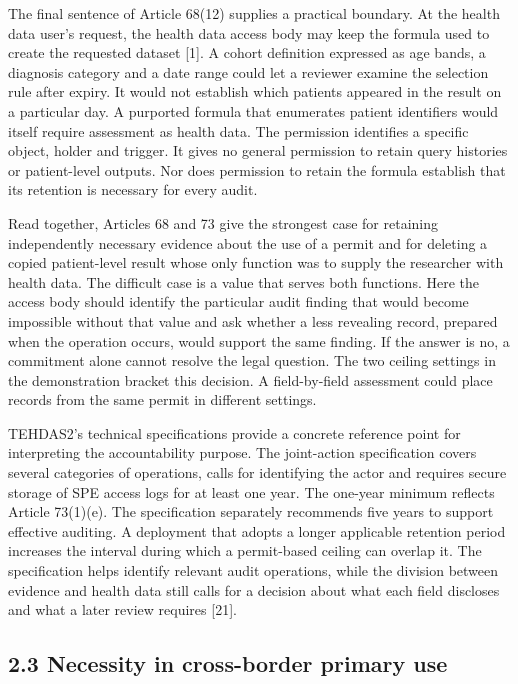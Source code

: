 \documentclass[preprint,review,12pt]{elsarticle}
\begin{document}
The final sentence of Article 68(12) supplies a practical boundary. At
the health data user's request, the health data access body may keep the
formula used to create the requested dataset {[}1{]}. A cohort
definition expressed as age bands, a diagnosis category and a date range
could let a reviewer examine the selection rule after expiry. It would
not establish which patients appeared in the result on a particular day.
A purported formula that enumerates patient identifiers would itself
require assessment as health data. The permission identifies a specific
object, holder and trigger. It gives no general permission to retain
query histories or patient-level outputs. Nor does permission to retain
the formula establish that its retention is necessary for every audit.

Read together, Articles 68 and 73 give the strongest case for retaining
independently necessary evidence about the use of a permit and for
deleting a copied patient-level result whose only function was to supply
the researcher with health data. The difficult case is a value that
serves both functions. Here the access body should identify the
particular audit finding that would become impossible without that value
and ask whether a less revealing record, prepared when the operation
occurs, would support the same finding. If the answer is no, a
commitment alone cannot resolve the legal question. The two ceiling
settings in the demonstration bracket this decision. A field-by-field
assessment could place records from the same permit in different
settings.

TEHDAS2's technical specifications provide a concrete reference point
for interpreting the accountability purpose. The joint-action
specification covers several categories of operations, calls for
identifying the actor and requires secure storage of SPE access logs for
at least one year. The one-year minimum reflects Article 73(1)(e). The
specification separately recommends five years to support effective
auditing. A deployment that adopts a longer applicable retention period
increases the interval during which a permit-based ceiling can overlap
it. The specification helps identify relevant audit operations, while
the division between evidence and health data still calls for a decision
about what each field discloses and what a later review requires
{[}21{]}.

\hypertarget{necessity-in-cross-border-primary-use}{%
\subsection{2.3 Necessity in cross-border primary
use}\label{necessity-in-cross-border-primary-use}}
\end{document}
